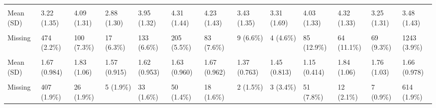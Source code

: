 \documentclass[
  single column]{article}
\begin{document}
\begin{landscape}
\begin{longtable}[t]{lllllllllllll}
\cellcolor{gray!10}{political\_conservative} & \cellcolor{gray!10}{} & \cellcolor{gray!10}{} & \cellcolor{gray!10}{} & \cellcolor{gray!10}{} & \cellcolor{gray!10}{} & \cellcolor{gray!10}{} & \cellcolor{gray!10}{} & \cellcolor{gray!10}{} & \cellcolor{gray!10}{} & \cellcolor{gray!10}{} & \cellcolor{gray!10}{} & \cellcolor{gray!10}{}\\
Mean (SD) & 3.22 (1.35) & 4.09 (1.31) & 2.88 (1.30) & 3.95 (1.32) & 4.31 (1.44) & 4.23 (1.43) & 3.43 (1.35) & 3.31 (1.69) & 4.03 (1.33) & 4.32 (1.33) & 3.25 (1.31) & 3.48 (1.43)\\
\cellcolor{gray!10}{Median [Min, Max]} & \cellcolor{gray!10}{3.00 [1.00, 7.00]} & \cellcolor{gray!10}{4.00 [1.00, 7.00]} & \cellcolor{gray!10}{3.00 [1.00, 7.00]} & \cellcolor{gray!10}{4.00 [1.00, 7.00]} & \cellcolor{gray!10}{4.00 [1.00, 7.00]} & \cellcolor{gray!10}{4.00 [1.00, 7.00]} & \cellcolor{gray!10}{3.00 [1.00, 7.00]} & \cellcolor{gray!10}{3.00 [1.00, 7.00]} & \cellcolor{gray!10}{4.00 [1.00, 7.00]} & \cellcolor{gray!10}{4.00 [1.00, 7.00]} & \cellcolor{gray!10}{3.00 [1.00, 7.00]} & \cellcolor{gray!10}{4.00 [1.00, 7.00]}\\
\addlinespace
Missing & 474 (2.2\%) & 100 (7.3\%) & 17 (6.3\%) & 133 (6.6\%) & 205 (5.5\%) & 83 (7.6\%) & 9 (6.6\%) & 4 (4.6\%) & 85 (12.9\%) & 64 (11.1\%) & 69 (9.3\%) & 1243 (3.9\%)\\
\cellcolor{gray!10}{rural\_gch\_2018\_l} & \cellcolor{gray!10}{} & \cellcolor{gray!10}{} & \cellcolor{gray!10}{} & \cellcolor{gray!10}{} & \cellcolor{gray!10}{} & \cellcolor{gray!10}{} & \cellcolor{gray!10}{} & \cellcolor{gray!10}{} & \cellcolor{gray!10}{} & \cellcolor{gray!10}{} & \cellcolor{gray!10}{} & \cellcolor{gray!10}{}\\
Mean (SD) & 1.67 (0.984) & 1.83 (1.06) & 1.57 (0.915) & 1.62 (0.953) & 1.63 (0.960) & 1.67 (0.962) & 1.37 (0.763) & 1.45 (0.813) & 1.15 (0.414) & 1.84 (1.06) & 1.76 (1.03) & 1.66 (0.978)\\
\cellcolor{gray!10}{Median [Min, Max]} & \cellcolor{gray!10}{1.00 [1.00, 5.00]} & \cellcolor{gray!10}{1.00 [1.00, 5.00]} & \cellcolor{gray!10}{1.00 [1.00, 5.00]} & \cellcolor{gray!10}{1.00 [1.00, 5.00]} & \cellcolor{gray!10}{1.00 [1.00, 5.00]} & \cellcolor{gray!10}{1.00 [1.00, 5.00]} & \cellcolor{gray!10}{1.00 [1.00, 4.00]} & \cellcolor{gray!10}{1.00 [1.00, 4.00]} & \cellcolor{gray!10}{1.00 [1.00, 4.00]} & \cellcolor{gray!10}{1.00 [1.00, 5.00]} & \cellcolor{gray!10}{1.00 [1.00, 5.00]} & \cellcolor{gray!10}{1.00 [1.00, 5.00]}\\
Missing & 407 (1.9\%) & 26 (1.9\%) & 5 (1.9\%) & 33 (1.6\%) & 50 (1.4\%) & 18 (1.6\%) & 2 (1.5\%) & 3 (3.4\%) & 51 (7.8\%) & 12 (2.1\%) & 7 (0.9\%) & 614 (1.9\%)\\

\end{longtable}
\end{landscape}
\end{document}
